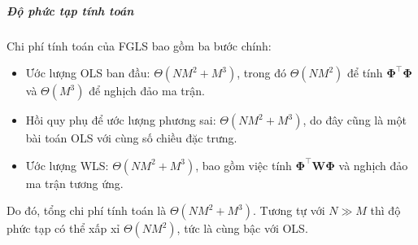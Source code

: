 \subparagraph{Độ phức tạp tính toán}

Chi phí tính toán của FGLS bao gồm ba bước chính: \begin{itemize}
  \item Ước lượng OLS ban đầu: $\Theta(NM^2 + M^3)$, trong đó $\Theta(NM^2)$ để
    tính $\boldsymbol{\Phi}^\intercal \boldsymbol{\Phi}$ và $\Theta(M^3)$ để
    nghịch đảo ma trận.

  \item Hồi quy phụ để ước lượng phương sai: $\Theta(NM^2 + M^3)$, do đây cũng
    là một bài toán OLS với cùng số chiều đặc trưng.

  \item Ước lượng WLS: $\Theta(NM^2 + M^3)$, bao gồm việc tính
    $\boldsymbol{\Phi}^\intercal \boldsymbol{W} \boldsymbol{\Phi}$ và nghịch
    đảo ma trận tương ứng.
\end{itemize} Do đó, tổng chi phí tính toán là $\Theta(NM^2 + M^3)$.  Tương tự
với  $N \gg M$ thì độ phức tạp có thể xấp xỉ $\Theta(NM^2)$, tức là cùng bậc
với OLS.
